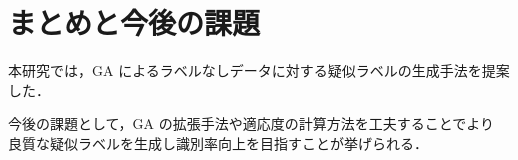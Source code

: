 \documentclass[a4paper,twoside,twocolumn,10pt]{jarticle}     %
\begin{document}
\section{まとめと今後の課題}
本研究では，GA によるラベルなしデータに対する疑似ラベルの生成手法を提案した．

今後の課題として，GA の拡張手法や適応度の計算方法を工夫することでより
良質な疑似ラベルを生成し識別率向上を目指すことが挙げられる．



\end{document}
